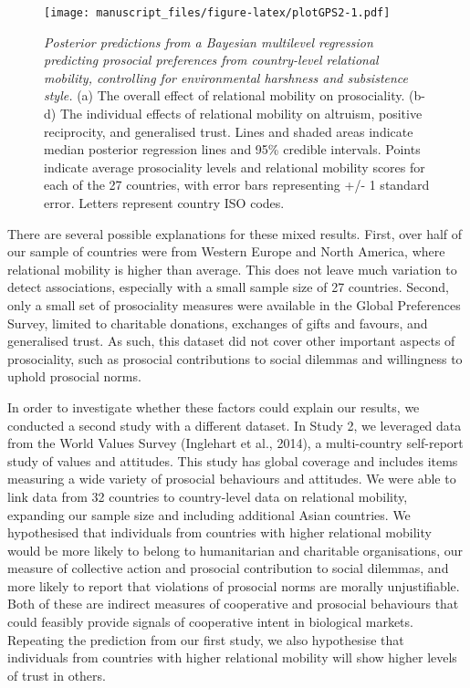 \documentclass[
  man,floatsintext]{apa6}
\begin{document}
\begin{figure}
\centering
\texttt{[image: manuscript\_files/figure-latex/plotGPS2-1.pdf]}
\caption{\label{fig:plotGPS2}\emph{Posterior predictions from a Bayesian multilevel regression predicting prosocial preferences from country-level relational mobility, controlling for environmental harshness and subsistence style.} (a) The overall effect of relational mobility on prosociality. (b-d) The individual effects of relational mobility on altruism, positive reciprocity, and generalised trust. Lines and shaded areas indicate median posterior regression lines and 95\% credible intervals. Points indicate average prosociality levels and relational mobility scores for each of the 27 countries, with error bars representing +/- 1 standard error. Letters represent country ISO codes.}
\end{figure}

There are several possible explanations for these mixed results. First, over half of our sample of countries were from Western Europe and North America, where relational mobility is higher than average. This does not leave much variation to detect associations, especially with a small sample size of 27 countries. Second, only a small set of prosociality measures were available in the Global Preferences Survey, limited to charitable donations, exchanges of gifts and favours, and generalised trust. As such, this dataset did not cover other important aspects of prosociality, such as prosocial contributions to social dilemmas and willingness to uphold prosocial norms.

In order to investigate whether these factors could explain our results, we conducted a second study with a different dataset. In Study 2, we leveraged data from the World Values Survey (Inglehart et al., 2014), a multi-country self-report study of values and attitudes. This study has global coverage and includes items measuring a wide variety of prosocial behaviours and attitudes. We were able to link data from 32 countries to country-level data on relational mobility, expanding our sample size and including additional Asian countries. We hypothesised that individuals from countries with higher relational mobility would be more likely to belong to humanitarian and charitable organisations, our measure of collective action and prosocial contribution to social dilemmas, and more likely to report that violations of prosocial norms are morally unjustifiable. Both of these are indirect measures of cooperative and prosocial behaviours that could feasibly provide signals of cooperative intent in biological markets. Repeating the prediction from our first study, we also hypothesise that individuals from countries with higher relational mobility will show higher levels of trust in others.
\end{document}
